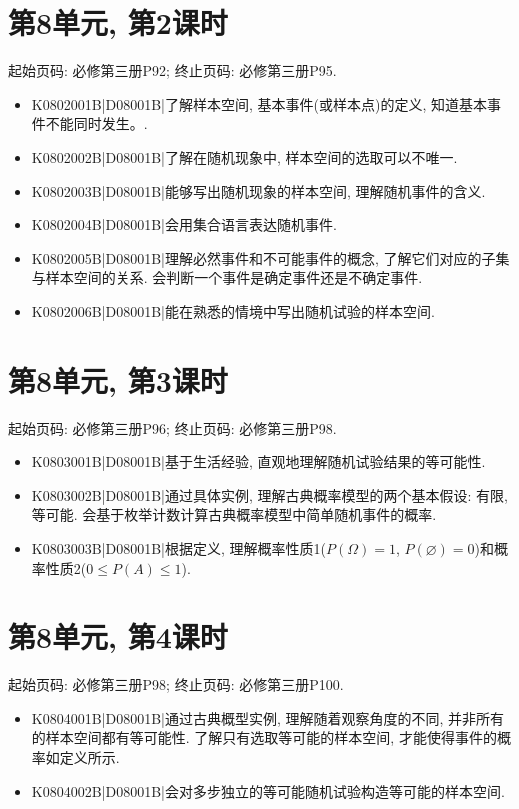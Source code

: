 \section*{第8单元, 第2课时}
起始页码: 必修第三册P92; 终止页码: 必修第三册P95.
\begin{itemize}
\item K0802001B|D08001B|了解样本空间, 基本事件(或样本点)的定义,  知道基本事件不能同时发生。.
\item K0802002B|D08001B|了解在随机现象中, 样本空间的选取可以不唯一.
\item K0802003B|D08001B|能够写出随机现象的样本空间, 理解随机事件的含义.
\item K0802004B|D08001B|会用集合语言表达随机事件.
\item K0802005B|D08001B|理解必然事件和不可能事件的概念, 了解它们对应的子集与样本空间的关系. 会判断一个事件是确定事件还是不确定事件.
\item K0802006B|D08001B|能在熟悉的情境中写出随机试验的样本空间.
\end{itemize}

\section*{第8单元, 第3课时}
起始页码: 必修第三册P96; 终止页码: 必修第三册P98.
\begin{itemize}
\item K0803001B|D08001B|基于生活经验, 直观地理解随机试验结果的等可能性.
\item K0803002B|D08001B|通过具体实例, 理解古典概率模型的两个基本假设: 有限, 等可能. 会基于枚举计数计算古典概率模型中简单随机事件的概率.
\item K0803003B|D08001B|根据定义, 理解概率性质1($P(\Omega)=1$, $P(\varnothing)=0$)和概率性质2($0\le P(A)\le 1$).
\end{itemize}

\section*{第8单元, 第4课时}
起始页码: 必修第三册P98; 终止页码: 必修第三册P100.
\begin{itemize}
\item K0804001B|D08001B|通过古典概型实例, 理解随着观察角度的不同, 并非所有的样本空间都有等可能性. 了解只有选取等可能的样本空间, 才能使得事件的概率如定义所示.
\item K0804002B|D08001B|会对多步独立的等可能随机试验构造等可能的样本空间.
\end{itemize}

